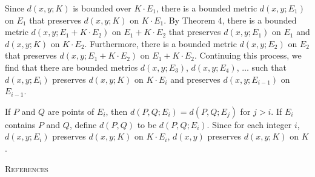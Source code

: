 \documentclass[11pt,a4paper,leqno,twoside]{article}
\begin{document}
Since $d(x,y;K)$ is bounded over $K\cdot E_1$, there is a bounded metric $d(x,y;E_1)$ on $E_1$ that preserves $d(x,y;K)$ on $K\cdot E_1$. By Theorem 4, there is a bounded metric $d(x,y;E_1+K\cdot E_2)$ on $E_1+K\cdot E_2$ that preserves $d(x,y;E_1)$ on $E_1$ and $d(x,y;K)$ on $K\cdot E_2$. Furthermore, there is a bounded metric $d(x,y;E_2)$ on $E_2$ that preserves $d(x,y;E_1+K\cdot E_2)$ on $E_1+K\cdot E_2$. Continuing this process, we find that there are bounded metrics $d(x,y;E_3)$, $d(x,y;E_4)$, $\ldots$ such that $d(x,y;E_i)$ preserves $d(x,y;K)$ on $K\cdot E_i$ and preserves $d(x,y;E_{i-1})$ on $E_{i-1}$.

If $P$ and $Q$ are points of $E_i$, then $d(P,Q;E_i)=d(P,Q;E_j)$ for $j>i$. If $E_i$ contains $P$ and $Q$, define $d(P,Q)$ to be $d(P,Q;E_i)$. Since for each integer $i$, $d(x,y;E_i)$ preserves $d(x,y;K)$ on $K\cdot E_i$, $d(x,y)$ preserves $d(x,y;K)$ on $K$.
\newpage
\begin{center}\textsc{References}\end{center}
\end{document}
